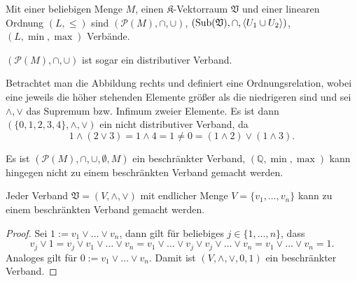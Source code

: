 \begin{example}
    Mit einer beliebigen Menge $M$, einen $\mathfrak{K}$-Vektorraum $\mathfrak{V}$ und einer linearen Ordnung $(L, \le)$ sind $(\mathcal{P}(M), \cap, \cup)$, $(\operatorname{Sub}(\mathfrak{V}), \cap, \langle U_1 \cup U_2 \rangle)$, $(L, \min, \max)$ Verbände.

    $(\mathcal{P}(M), \cap, \cup)$ ist sogar ein distributiver Verband.

    \begin{minipage}{0.56\textwidth}
        Betrachtet man die Abbildung rechts und definiert eine Ordnungsrelation, wobei eine jeweils die höher stehenden Elemente größer als die niedrigeren sind und sei $\wedge, \vee$ das Supremum bzw. Infimum zweier Elemente. Es ist dann $(\{0,1,2,3,4\}, \wedge, \vee)$ ein nicht distributiver Verband, da
        $$ 1 \wedge (2 \vee 3) = 1 \wedge 4 = 1 \neq 0 = (1 \wedge 2) \vee ( 1 \wedge 3). $$
    \end{minipage}
    \hspace{0.02\textwidth}
    \begin{minipage}{0.4\textwidth}
        \centering
    \end{minipage}

    Es ist $(\mathcal{P}(M), \cap, \cup, \emptyset, M)$ ein beschränkter Verband, $(\mathbb{Q}, \min, \max)$ kann hingegen nicht zu einem beschränkten Verband gemacht werden.
\end{example}

\begin{lemma}
    Jeder Verband $\mathfrak{V} = (V, \wedge, \vee)$ mit endlicher Menge $V = \{v_1, \ldots, v_n\}$ kann zu einem beschränkten Verband gemacht werden.
\end{lemma}
\begin{proof}
    Sei $1 := v_1 \vee \ldots \vee v_n$, dann gilt für beliebiges $j \in \{1, \ldots, n\}$, dass $$v_j \vee 1 = v_j \vee v_1 \vee \ldots \vee v_n =  v_1 \vee \ldots \vee v_j \vee v_j \vee \ldots \vee v_n = v_1 \vee \ldots \vee v_n = 1.$$
    Analoges gilt für $0 := v_1 \vee \ldots \vee v_n$. Damit ist $(V, \wedge, \vee, 0, 1)$ ein beschränkter Verband. 
\end{proof}


